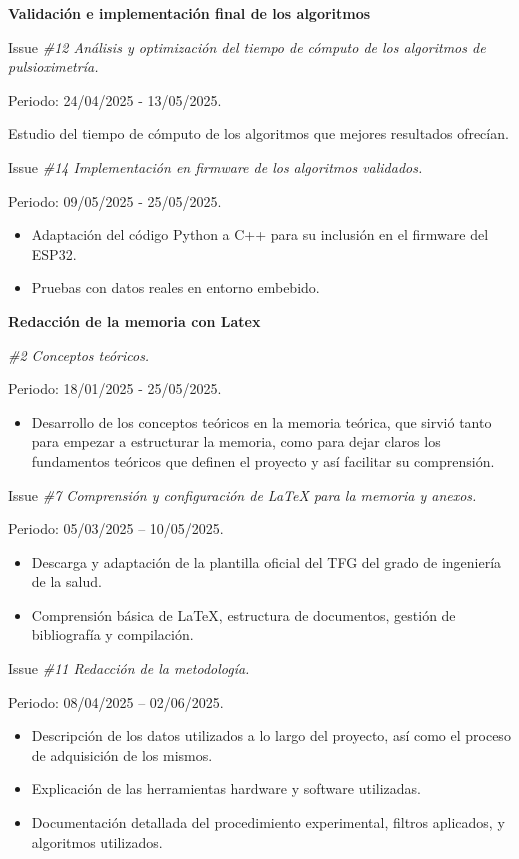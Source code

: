 \textbf{Validación e implementación final de los algoritmos}

Issue \textit{\#12 Análisis y optimización del tiempo de cómputo de los algoritmos de pulsioximetría.}

Periodo: 24/04/2025 - 13/05/2025.

Estudio del tiempo de cómputo de los algoritmos que mejores resultados ofrecían.

\vspace{0.3cm}

Issue \textit{\#14 Implementación en firmware de los algoritmos validados.}

Periodo: 09/05/2025 - 25/05/2025.

\begin{itemize}
    \item Adaptación del código Python a C++ para su inclusión en el firmware del ESP32.
    \item Pruebas con datos reales en entorno embebido.
\end{itemize}

\textbf{Redacción de la memoria con Latex}

\textit{\#2 Conceptos teóricos.}

Periodo: 18/01/2025 - 25/05/2025.

\begin{itemize}
    \item Desarrollo de los conceptos teóricos en la memoria teórica, que sirvió tanto para empezar a estructurar la memoria, como para dejar claros los fundamentos teóricos que definen el proyecto y así facilitar su comprensión.
\end{itemize}

Issue \textit{\#7 Comprensión y configuración de LaTeX para la memoria y anexos.}

Periodo: 05/03/2025 – 10/05/2025.

\begin{itemize}
    \item Descarga y adaptación de la plantilla oficial del TFG del grado de ingeniería de la salud.
    \item Comprensión básica de LaTeX, estructura de documentos, gestión de bibliografía y compilación.
\end{itemize}

Issue \textit{\#11 Redacción de la metodología.}

Periodo: 08/04/2025 – 02/06/2025.

\begin{itemize}
    \item Descripción de los datos utilizados a lo largo del proyecto, así como el proceso de adquisición de los mismos.
    \item Explicación de las herramientas hardware y software utilizadas.
    \item Documentación detallada del procedimiento experimental, filtros aplicados, y algoritmos utilizados.
\end{itemize}


